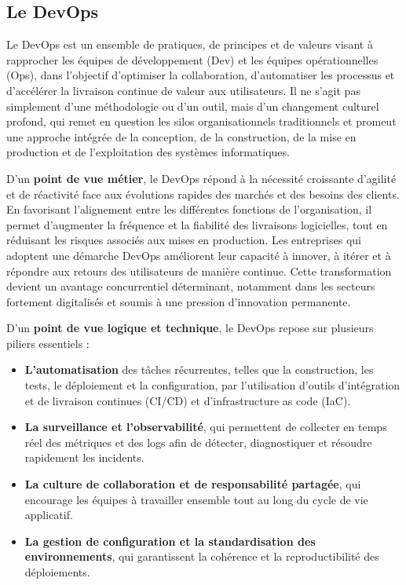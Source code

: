 \subsection{Le DevOps}

Le DevOps est un ensemble de pratiques, de principes et de valeurs visant à rapprocher les équipes de développement (Dev) et les équipes opérationnelles (Ops), dans l’objectif d’optimiser la collaboration, d’automatiser les processus et d’accélérer la livraison continue de valeur aux utilisateurs. Il ne s’agit pas simplement d’une méthodologie ou d’un outil, mais d’un changement culturel profond, qui remet en question les silos organisationnels traditionnels et promeut une approche intégrée de la conception, de la construction, de la mise en production et de l’exploitation des systèmes informatiques.

D’un \textbf{point de vue métier}, le DevOps répond à la nécessité croissante d’agilité et de réactivité face aux évolutions rapides des marchés et des besoins des clients. En favorisant l’alignement entre les différentes fonctions de l’organisation, il permet d’augmenter la fréquence et la fiabilité des livraisons logicielles, tout en réduisant les risques associés aux mises en production. Les entreprises qui adoptent une démarche DevOps améliorent leur capacité à innover, à itérer et à répondre aux retours des utilisateurs de manière continue. Cette transformation devient un avantage concurrentiel déterminant, notamment dans les secteurs fortement digitalisés et soumis à une pression d’innovation permanente.

D’un \textbf{point de vue logique et technique}, le DevOps repose sur plusieurs piliers essentiels :
\begin{itemize}
	\item \textbf{L’automatisation} des tâches récurrentes, telles que la construction, les tests, le déploiement et la configuration, par l’utilisation d’outils d’intégration et de livraison continues (CI/CD) et d’infrastructure as code (IaC).
	\item \textbf{La surveillance et l’observabilité}, qui permettent de collecter en temps réel des métriques et des logs afin de détecter, diagnostiquer et résoudre rapidement les incidents.
	\item \textbf{La culture de collaboration et de responsabilité partagée}, qui encourage les équipes à travailler ensemble tout au long du cycle de vie applicatif.
	\item \textbf{La gestion de configuration et la standardisation des environnements}, qui garantissent la cohérence et la reproductibilité des déploiements.
\end{itemize}


